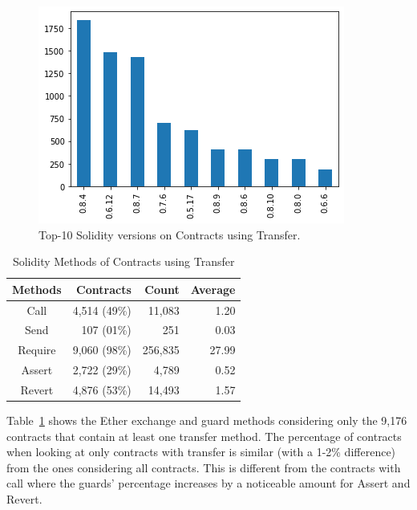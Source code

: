 \documentclass[10pt,conference]{IEEEtran}
\begin{document}
\begin{figure}[h]
  \centering
  \includegraphics[width=\linewidth]{img/send_versions_clean.png}
  \caption{Top-10 Solidity versions on Contracts using Transfer.}
  \label{fig:transfer_version}
\end{figure}

\begin{table}
\center
  \caption{Solidity Methods of Contracts using Transfer}
  \label{tab:transfer}
  \begin{tabular}{crrr}
    \hline
    Methods & Contracts & Count & Average \\
    \hline
    Call & 4,514 (49\%) & 11,083 & 1.20\\
    Send &107 (01\%) & 251 & 0.03\\
    Require & 9,060 (98\%) &256,835 & 27.99\\
    Assert & 2,722 (29\%) & 4,789 & 0.52\\
    Revert & 4,876 (53\%) & 14,493 & 1.57 \\
    \hline
\end{tabular}
\end{table}


Table~\ref{tab:transfer} shows the Ether exchange and guard methods considering only the 9,176 contracts that contain at least one transfer method. The percentage of contracts when looking at only contracts with transfer is similar (with a 1-2\% difference) from the ones considering all contracts. This is different from the contracts with call where the guards' percentage increases by a noticeable amount for Assert and Revert.
\end{document}
